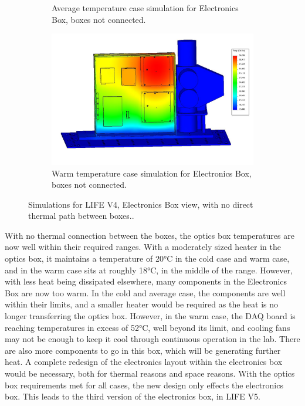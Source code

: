 \begin{figure}
\begin{subfigure}[h]{0.53\textwidth}
        \caption{Average temperature case simulation for Electronics Box, boxes not connected.}
        \label{fig:LIFE_V4_TA_Ebox_2b}
    \end{subfigure}
    \begin{subfigure}[h]{0.53\textwidth}
        \centering
        \includegraphics[width=\textwidth]{chap3_images/LIFE_V4_images/TA_Full_Model_Iter_12_ebox.JPG}
        \caption{Warm temperature case simulation for Electronics Box, boxes not connected.}
        \label{fig:LIFE_V4_TA_Ebox_2c}
    \end{subfigure}
    \caption{Simulations for LIFE V4, Electronics Box view, with no direct thermal path between boxes..}
    \label{LIFE_V4_TA_2_Ebox}
\end{figure}

With no thermal connection between the boxes, the optics box temperatures are now well within their required ranges. With a moderately sized heater in the optics box, it maintains a temperature of 20°C in the cold case and warm case, and in the warm case sits at roughly 18°C, in the middle of the range. However, with less heat being dissipated elsewhere, many components in the Electronics Box are now too warm. In the cold and average case, the components are well within their limits, and a smaller heater would be required as the heat is no longer transferring the optics box. However, in the warm case, the DAQ board is reaching temperatures in excess of 52°C, well beyond its limit, and cooling fans may not be enough to keep it cool through continuous operation in the lab. There are also more components to go in this box, which will be generating further heat. A complete redesign of the electronics layout within the electronics box would be necessary, both for thermal reasons and space reasons. With the optics box requirements met for all cases, the new design only effects the electronics box. This leads to the third version of the electronics box, in LIFE V5.

